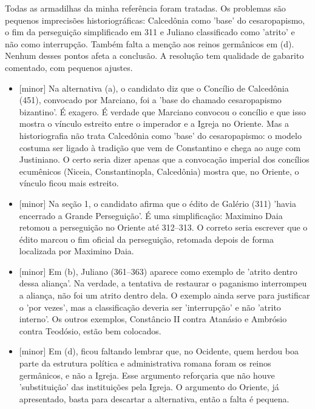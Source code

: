 \documentclass{article}%
\begin{document}
Todas as armadilhas da minha referência foram tratadas. Os problemas são pequenos imprecisões historiográficas: Calcedônia como 'base' do cesaropapismo, o fim da perseguição simplificado em 311 e Juliano classificado como 'atrito' e não como interrupção. Também falta a menção aos reinos germânicos em (d). Nenhum desses pontos afeta a conclusão. A resolução tem qualidade de gabarito comentado, com pequenos ajustes.%
\begin{itemize}%
\item%
{[}minor{]} Na alternativa (a), o candidato diz que o Concílio de Calcedônia (451), convocado por Marciano, foi a 'base do chamado cesaropapismo bizantino'. É exagero. É verdade que Marciano convocou o concílio e que isso mostra o vínculo estreito entre o imperador e a Igreja no Oriente. Mas a historiografia não trata Calcedônia como 'base' do cesaropapismo: o modelo costuma ser ligado à tradição que vem de Constantino e chega ao auge com Justiniano. O certo seria dizer apenas que a convocação imperial dos concílios ecumênicos (Niceia, Constantinopla, Calcedônia) mostra que, no Oriente, o vínculo ficou mais estreito.%
\item%
{[}minor{]} Na seção 1, o candidato afirma que o édito de Galério (311) 'havia encerrado a Grande Perseguição'. É uma simplificação: Maximino Daia retomou a perseguição no Oriente até 312--313. O correto seria escrever que o édito marcou o fim oficial da perseguição, retomada depois de forma localizada por Maximino Daia.%
\item%
{[}minor{]} Em (b), Juliano (361--363) aparece como exemplo de 'atrito dentro dessa aliança'. Na verdade, a tentativa de restaurar o paganismo interrompeu a aliança, não foi um atrito dentro dela. O exemplo ainda serve para justificar o 'por vezes', mas a classificação deveria ser 'interrupção' e não 'atrito interno'. Os outros exemplos, Constâncio II contra Atanásio e Ambrósio contra Teodósio, estão bem colocados.%
\item%
{[}minor{]} Em (d), ficou faltando lembrar que, no Ocidente, quem herdou boa parte da estrutura política e administrativa romana foram os reinos germânicos, e não a Igreja. Esse argumento reforçaria que não houve 'substituição' das instituições pela Igreja. O argumento do Oriente, já apresentado, basta para descartar a alternativa, então a falta é pequena.%
\end{itemize}%
\end{document}
